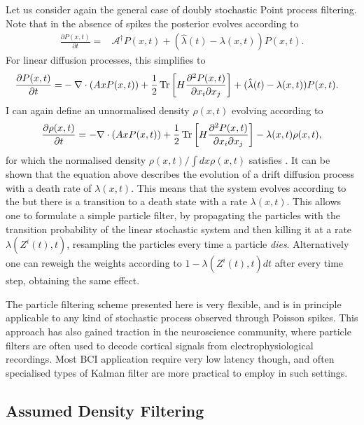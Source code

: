 {Let us consider again the general case of doubly stochastic Point process filtering. Note that in the absence of spikes the posterior evolves according to
\begin{align*}
\frac{\partial P(x,t)}{\partial t} =& \mathcal{A}^\dagger P(x,t) + (\hat{\lambda}(t) - \lambda(x,t) ) P(x,t).
\end{align*}
For linear diffusion processes, this simplifies to
\begin{align}
\label{eq:particle_fokkerplanck}
\frac{\partial P(x,t)}{\partial t} =& -\nabla \cdot \left(Ax P(x,t)\right) + \frac{1}{2}\Tr\left[ H \frac{\partial^2 P(x,t)}{\partial x_i\partial x_j}\right]+ (\hat{\lambda}(t) - \lambda(x,t) ) P(x,t).
\end{align}
I can again define an unnormalised density $\rho(x,t)$ evolving according to
\[
\frac{\partial \rho(x,t)}{\partial t} =-\nabla \cdot \left(Ax P(x,t)\right) + \frac{1}{2}\operatorname{Tr}\left[ H \frac{\partial^2 P(x,t)}{\partial x_i\partial x_j}\right] -\lambda(x,t) \rho(x,t),
\]
for which the normalised density $\rho(x,t) / \int dx \rho(x,t)$ satisfies .
It can be shown that the equation above describes the evolution of a drift diffusion process with a death rate of $\lambda(x,t)$. This means that the system evolves
according to the  but there is a transition to a death state with a rate $\lambda(x,t)$. This allows one to formulate a simple particle 
filter, by propagating the particles with the transition probability of the linear stochastic system and then killing it at a rate $\lambda(Z^i(t),t)$, resampling the particles every
time a particle \emph{dies}. Alternatively one can reweigh the weights according to $1-\lambda(Z^i(t),t)dt$ after every time step, obtaining the same effect.
\par
The particle filtering scheme presented here is very flexible, and is in principle applicable to any kind of stochastic process observed through Poisson spikes. This
approach has also gained traction in the neuroscience community, where particle filters are often used to decode cortical signals from electrophysiological
recordings. Most BCI application require very low latency though, and often specialised types of Kalman filter are more practical to employ in such settings.

\subsection{Assumed Density Filtering}

}
